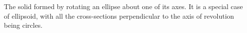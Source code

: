The solid formed by rotating an ellipse about one of its axes. It is a special
case of ellipsoid, with all the cross-sections perpendicular to the axis of revolution
being circles.